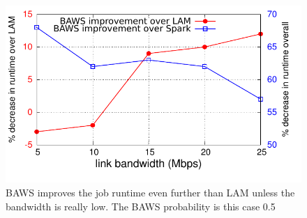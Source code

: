 \begin{figure}[!ht]
\centering\includegraphics[width=\columnwidth]{figs/baws.pdf}
\vspace{-1.2em}
\caption{BAWS improves the job runtime even further than LAM unless the bandwidth is really low. The BAWS probability is this case 0.5}
\label{fig:baws}
\vspace{.7em}
\end{figure}